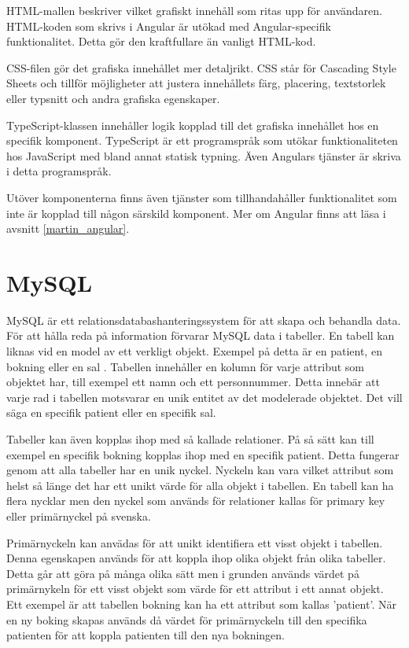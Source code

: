 HTML-mallen beskriver vilket grafiskt innehåll som ritas upp för användaren. HTML-koden som skrivs i Angular är utökad med Angular-specifik funktionalitet. Detta gör den kraftfullare än vanligt HTML-kod.

CSS-filen gör det grafiska innehållet mer detaljrikt. CSS står för Cascading Style Sheets och tillför möjligheter att justera innehållets färg, placering, textstorlek eller typsnitt och andra grafiska egenskaper.  

TypeScript-klassen innehåller logik kopplad till det grafiska innehållet hos en specifik komponent. TypeScript är ett programspråk som utökar funktionaliteten hos JavaScript med bland annat statisk typning. Även Angulars tjänster är skriva i detta programspråk.

Utöver komponenterna finns även tjänster som tillhandahåller funktionalitet som inte är kopplad till någon särskild komponent. Mer om Angular finns att läsa i avsnitt \ref{martin_angular}.
 
\section{MySQL}
MySQL är ett relationsdatabashanteringssystem för att skapa och behandla data. För att hålla reda på 
information förvarar MySQL data i tabeller. En tabell kan liknas vid en model av ett verkligt objekt. 
Exempel på detta är en patient, en bokning eller en sal \cite{mysql}. Tabellen innehåller en kolumn för varje 
attribut som objektet har, till exempel ett namn och ett personnummer. Detta innebär att varje rad i 
tabellen motsvarar en unik entitet av det modelerade objektet. Det vill säga en specifik patient eller 
en specifik sal.

Tabeller kan även kopplas ihop med så kallade relationer. På så sätt kan till exempel en specifik bokning kopplas ihop med en specifik patient. Detta fungerar genom att alla tabeller har en unik nyckel. Nyckeln kan vara vilket attribut som helst så länge det har ett unikt värde för alla objekt i tabellen. En tabell kan ha flera nycklar men den nyckel som används för relationer kallas för primary key eller primärnyckel på svenska. 

Primärnyckeln kan anvädas för att unikt identifiera ett visst objekt i tabellen. Denna egenskapen används för att koppla ihop olika objekt från olika tabeller. Detta går att göra på många olika sätt men i grunden används värdet på primärnykeln för ett visst objekt som värde för ett attribut i ett annat objekt. Ett exempel är att tabellen bokning kan ha ett attribut som kallas 'patient'. När en ny boking skapas används då värdet för primärnyckeln till den specifika patienten för att koppla patienten till den nya bokningen.

